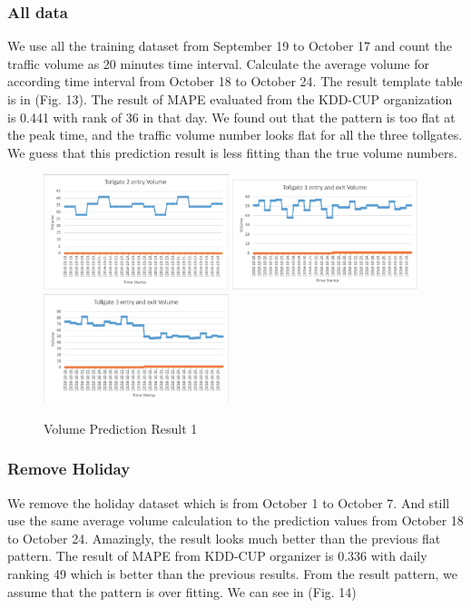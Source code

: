 \documentclass[journal, letterpaper]{IEEEtran}
\begin{document}
\subsubsection{All data}
We use all the training dataset from September 19 to October 17 and count the traffic volume as 20 minutes time interval. Calculate the average volume for according time interval from October 18 to October 24. The result template table is in (Fig. 13). The result of MAPE evaluated from the KDD-CUP organization is 0.441 with rank of 36 in that day. We found out that the pattern is too flat at the peak time, and the traffic volume number looks flat for all the three tollgates. We guess that this prediction result is less fitting than the true volume numbers. 
\begin{figure} [H]
  \centering
  \includegraphics[width=0.48\textwidth]{t2_1.png}
  \includegraphics[width=0.48\textwidth]{t1_1.png}
  \includegraphics[width=0.48\textwidth]{t3_1.png}
  \caption{Volume Prediction Result 1}
  \label{fig:13}
\end{figure}

\subsubsection{Remove Holiday}
We remove the holiday dataset which is from October 1 to October 7. And still use the same average volume calculation to the prediction values from October 18 to October 24. Amazingly, the result looks much better than the previous flat pattern. The result of MAPE from KDD-CUP organizer is 0.336 with daily ranking 49 which is better than the previous results. From the result pattern, we assume that the pattern is over fitting. We can see in (Fig. 14)
\end{document}
